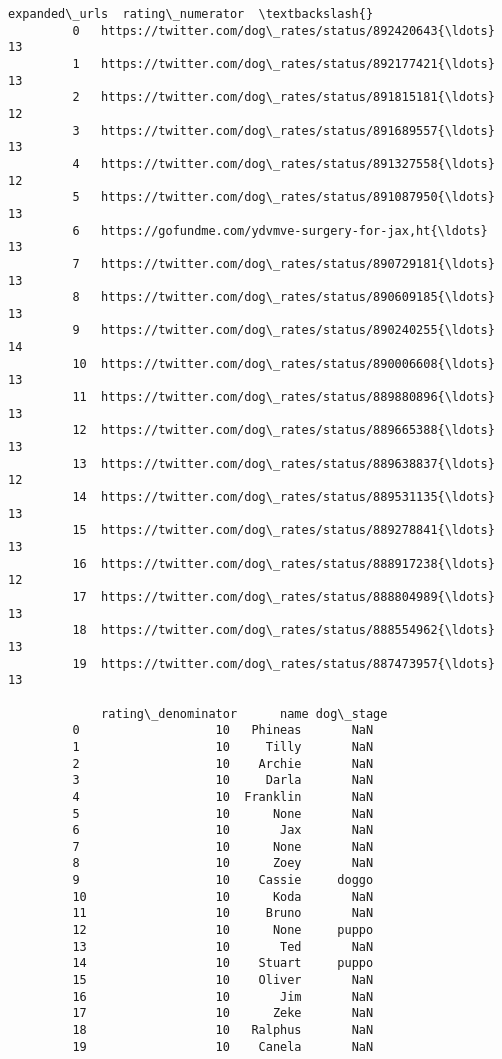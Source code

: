 \documentclass[11pt]{article}
\begin{document}
\begin{Verbatim}[commandchars=\\\{\}]
                                                 expanded\_urls  rating\_numerator  \textbackslash{}
         0   https://twitter.com/dog\_rates/status/892420643{\ldots}                13   
         1   https://twitter.com/dog\_rates/status/892177421{\ldots}                13   
         2   https://twitter.com/dog\_rates/status/891815181{\ldots}                12   
         3   https://twitter.com/dog\_rates/status/891689557{\ldots}                13   
         4   https://twitter.com/dog\_rates/status/891327558{\ldots}                12   
         5   https://twitter.com/dog\_rates/status/891087950{\ldots}                13   
         6   https://gofundme.com/ydvmve-surgery-for-jax,ht{\ldots}                13   
         7   https://twitter.com/dog\_rates/status/890729181{\ldots}                13   
         8   https://twitter.com/dog\_rates/status/890609185{\ldots}                13   
         9   https://twitter.com/dog\_rates/status/890240255{\ldots}                14   
         10  https://twitter.com/dog\_rates/status/890006608{\ldots}                13   
         11  https://twitter.com/dog\_rates/status/889880896{\ldots}                13   
         12  https://twitter.com/dog\_rates/status/889665388{\ldots}                13   
         13  https://twitter.com/dog\_rates/status/889638837{\ldots}                12   
         14  https://twitter.com/dog\_rates/status/889531135{\ldots}                13   
         15  https://twitter.com/dog\_rates/status/889278841{\ldots}                13   
         16  https://twitter.com/dog\_rates/status/888917238{\ldots}                12   
         17  https://twitter.com/dog\_rates/status/888804989{\ldots}                13   
         18  https://twitter.com/dog\_rates/status/888554962{\ldots}                13   
         19  https://twitter.com/dog\_rates/status/887473957{\ldots}                13   
         
             rating\_denominator      name dog\_stage  
         0                   10   Phineas       NaN  
         1                   10     Tilly       NaN  
         2                   10    Archie       NaN  
         3                   10     Darla       NaN  
         4                   10  Franklin       NaN  
         5                   10      None       NaN  
         6                   10       Jax       NaN  
         7                   10      None       NaN  
         8                   10      Zoey       NaN  
         9                   10    Cassie     doggo  
         10                  10      Koda       NaN  
         11                  10     Bruno       NaN  
         12                  10      None     puppo  
         13                  10       Ted       NaN  
         14                  10    Stuart     puppo  
         15                  10    Oliver       NaN  
         16                  10       Jim       NaN  
         17                  10      Zeke       NaN  
         18                  10   Ralphus       NaN  
         19                  10    Canela       NaN  
\end{Verbatim}
            
\end{document}
